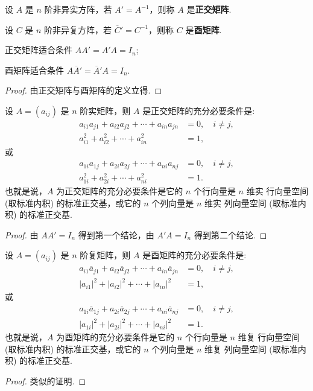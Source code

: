 \documentclass[../../main.tex]{subfiles}
\begin{document}
\begin{definition}[正交矩阵和酉矩阵]
设 $A$ 是 $n$ 阶非异实方阵，若 $A' = A^{-1}$，则称 $A$ 是\textbf{正交矩阵}. 

设 $C$ 是 $n$ 阶非异复方阵，若 $\overline{C}' = C^{-1}$，则称 $C$ 是\textbf{酉矩阵}.
\end{definition}

\begin{theorem}
正交矩阵适合条件 $AA' = A'A = I_n$;

酉矩阵适合条件 $A\overline{A}' = \overline{A}'A = I_n$.
\end{theorem}
\begin{proof}
由正交矩阵与酉矩阵的定义立得.
\end{proof}

\begin{theorem}\label{theorem:正交矩阵的基本性质1}
设 $A = (a_{ij})$ 是 $n$ 阶实矩阵，则 $A$ 是正交矩阵的充分必要条件是:
\begin{align*}
a_{i1}a_{j1} + a_{i2}a_{j2} + \cdots + a_{in}a_{jn} &= 0,\quad i \neq j,\\
a_{i1}^2 + a_{i2}^2 + \cdots + a_{in}^2 &= 1,
\end{align*}
或
\begin{align*}
a_{1i}a_{1j} + a_{2i}a_{2j} + \cdots + a_{ni}a_{nj} &= 0,\quad i \neq j,\\
a_{1i}^2 + a_{2i}^2 + \cdots + a_{ni}^2 &= 1.
\end{align*}
也就是说，$A$ 为正交矩阵的充分必要条件是它的 $n$ 个行向量是 $n$ 维实 行向量空间 (取标准内积) 的标准正交基，或它的 $n$ 个列向量是 $n$ 维实 列向量空间 (取标准内积) 的标准正交基.
\end{theorem}
\begin{proof}
由 $AA' = I_n$ 得到第一个结论，由 $A'A = I_n$ 得到第二个结论.
\end{proof}

\begin{theorem}\label{theorem:酉矩阵的基本性质1}
设 $A = (a_{ij})$ 是 $n$ 阶复矩阵，则 $A$ 是酉矩阵的充分必要条件是:
\begin{align*}
a_{i1}\overline{a}_{j1} + a_{i2}\overline{a}_{j2} + \cdots + a_{in}\overline{a}_{jn} &= 0,\quad i \neq j,\\
|a_{i1}|^2 + |a_{i2}|^2 + \cdots + |a_{in}|^2 &= 1,
\end{align*}
或
\begin{align*}
a_{1i}\overline{a}_{1j} + a_{2i}\overline{a}_{2j} + \cdots + a_{ni}\overline{a}_{nj} &= 0,\quad i \neq j,\\
|a_{1i}|^2 + |a_{2i}|^2 + \cdots + |a_{ni}|^2 &= 1.
\end{align*}
也就是说，$A$ 为酉矩阵的充分必要条件是它的 $n$ 个行向量是 $n$ 维复 行向量空间 (取标准内积) 的标准正交基，或它的 $n$ 个列向量是 $n$ 维复 列向量空间 (取标准内积) 的标准正交基.
\end{theorem}
\begin{proof}
类似的证明.
\end{proof}
\end{document}
